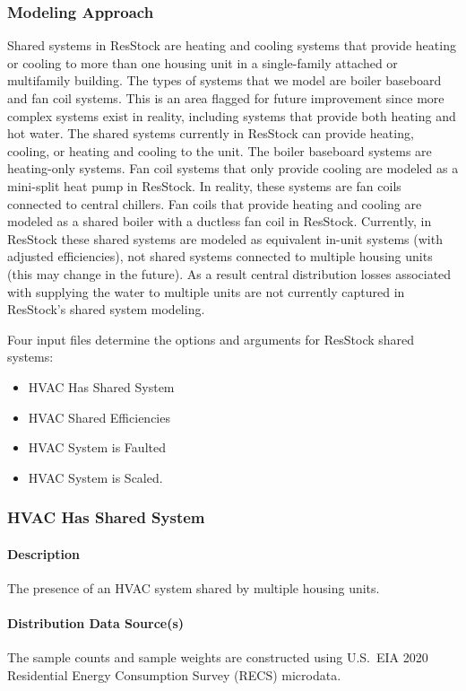 \subsubsection{Modeling Approach}
Shared systems in ResStock are heating and cooling systems that provide heating or cooling to more than one housing unit in a single-family attached or multifamily building. The types of systems that we model are boiler baseboard and fan coil systems. This is an area flagged for future improvement since more complex systems exist in reality, including systems that provide both heating and hot water. The shared systems currently in ResStock can provide heating, cooling, or heating and cooling to the unit. The boiler baseboard systems are heating-only systems. Fan coil systems that only provide cooling are modeled as a mini-split heat pump in ResStock. In reality, these systems are fan coils connected to central chillers. Fan coils that provide heating and cooling are modeled as a shared boiler with a ductless fan coil in ResStock. Currently, in ResStock these shared systems are modeled as equivalent in-unit systems (with adjusted efficiencies), not shared systems connected to multiple housing units (this may change in the future). As a result central distribution losses associated with supplying the water to multiple units are not currently captured in ResStock's shared system modeling.

Four input files determine the options and arguments for ResStock shared systems:
\begin{itemize}
    \item HVAC Has Shared System
    \item HVAC Shared Efficiencies
    \item HVAC System is Faulted
    \item HVAC System is Scaled.
\end{itemize}

\subsubsection{HVAC Has Shared System}
\paragraph{Description}
The presence of an HVAC system shared by multiple housing units.

\paragraph{Distribution Data Source(s)}
The sample counts and sample weights are constructed using U.S.~EIA 2020 Residential Energy Consumption Survey (RECS) microdata.

